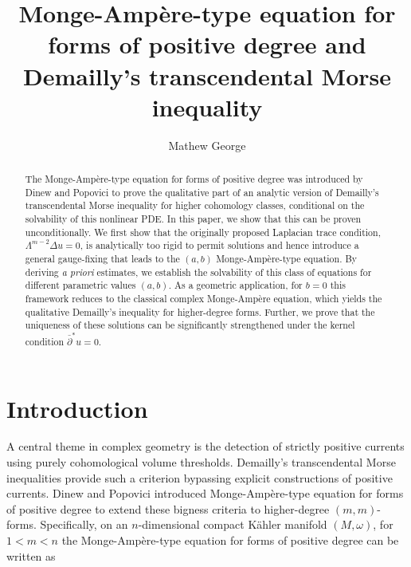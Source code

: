 \documentclass[11pt,letterpaper]{amsart}
\numberwithin{equation}{section}
\begin{document}
\title[Monge-Amp\`ere-type equation and Demailly's Morse inequality]{Monge-Amp\`ere-type equation for forms of positive degree and Demailly's transcendental Morse inequality}

\author{Mathew George}
\date{}


\begin{abstract}
    The Monge-Ampère-type equation for forms of positive degree was introduced by Dinew and Popovici to prove the qualitative part of an analytic version of Demailly's transcendental Morse inequality for higher cohomology classes, conditional on the solvability of this nonlinear PDE. In this paper, we show that this can be proven unconditionally. We first show that the originally proposed Laplacian trace condition, $\Lambda^{m-2}\Delta u = 0$, is analytically too rigid to permit solutions and hence introduce a general gauge-fixing that leads to the $(a,b)$ Monge-Ampère-type equation. By deriving \emph{a priori} estimates, we establish the solvability of this class of equations for different parametric values $(a,b)$. As a geometric application, for $b=0$ this framework reduces to the classical complex Monge-Amp\`ere equation, which yields the qualitative Demailly's inequality for higher-degree forms. Further, we prove that the uniqueness of these solutions can be significantly strengthened under the kernel condition $\bar{\partial}^* u = 0$.
\end{abstract}


\maketitle

\bigskip

\section{Introduction}


A central theme in complex geometry is the detection of strictly positive currents using purely cohomological volume thresholds. Demailly’s transcendental Morse inequalities \cite{Dem2010} provide such a criterion bypassing explicit constructions of positive currents. Dinew and Popovici \cite{DP25} introduced Monge-Ampère-type equation for forms of positive degree to extend these bigness criteria to higher-degree $(m,m)$-forms. Specifically, on an $n$-dimensional compact Kähler manifold $(M, \omega)$, for $ 1< m < n$ the Monge-Amp\`ere-type equation for forms of positive degree can be written as
\end{document}
